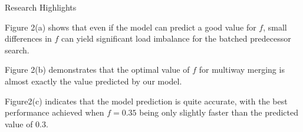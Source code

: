 \documentclass[final]{beamer}
\newlength{\colwidth}
\begin{document}
\begin{frame}[t]
\begin{columns}[t]
\begin{column}{\colwidth}
\begin{block}{Research Highlights}
\begin{figure}[htp]
\centering
{}

 \label{fig:time_vs_f}
\end{figure}



\begin{description}[font=$\bullet$~\normalfont\scshape\color{red!50!black}]
\item  Figure 2(a) shows that even if the model can predict a good value for $f$, small differences in $f$ can yield significant load imbalance for the batched predecessor search. 
\item Figure 2(b) demonstrates that the optimal value of $f$ for multiway merging is almost exactly the value predicted by our model.
\item  Figure2(c) indicates that the model prediction is quite accurate, with the best performance achieved when $f=0.35$ being only slightly faster than the predicted value of 0.3.
\end{description}





\end{block}
\end{column}
\end{columns}
\end{frame}
\end{document}
